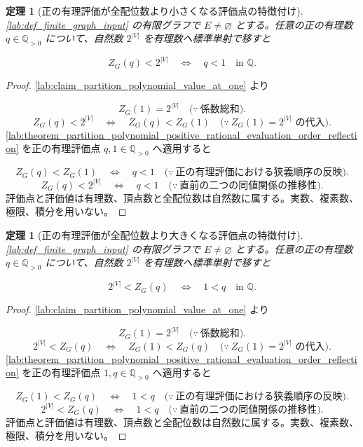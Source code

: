 \documentclass[11pt,a4paper]{article}
\newtheorem{theorem}[definition]{定理}
\theoremstyle{remark}
\begin{document}
\begin{theorem}[正の有理評価が全配位数より小さくなる評価点の特徴付け]\label{lab:theorem_partition_polynomial_positive_rational_evaluation_strictly_below_configuration_count}
\cref{lab:def_finite_graph_input}
 の有限グラフで 
$E\ne\varnothing$
 とする。任意の正の有理数 
$q\in\mathbb Q_{>0}$
 について、自然数 
$2^{|V|}$
 を有理数へ標準単射で移すと

\[Z_G(q)<2^{|V|}\quad\Longleftrightarrow\quad q<1\quad\text{in }\mathbb Q.\]
\end{theorem}
\begin{proof}
\cref{lab:claim_partition_polynomial_value_at_one}
 より

\[Z_G(1)=2^{|V|}
\quad\bigl(\because\ \text{係数総和}\bigr).\]
\[Z_G(q)<2^{|V|}
\quad\Longleftrightarrow\quad
Z_G(q)<Z_G(1)
\quad\bigl(\because\ Z_G(1)=2^{|V|}\text{ の代入}\bigr).\]
\cref{lab:theorem_partition_polynomial_positive_rational_evaluation_order_reflection}
 を正の有理評価点 
$q,1\in\mathbb Q_{>0}$
 へ適用すると

\[Z_G(q)<Z_G(1)
\quad\Longleftrightarrow\quad
q<1
\quad\bigl(\because\ \text{正の有理評価における狭義順序の反映}\bigr).\]
\[Z_G(q)<2^{|V|}
\quad\Longleftrightarrow\quad
q<1
\quad\bigl(\because\ \text{直前の二つの同値関係の推移性}\bigr).\]
評価点と評価値は有理数、頂点数と全配位数は自然数に属する。実数、複素数、極限、積分を用いない。

\end{proof}

\begin{theorem}[正の有理評価が全配位数より大きくなる評価点の特徴付け]\label{lab:theorem_partition_polynomial_positive_rational_evaluation_strictly_above_configuration_count}
\cref{lab:def_finite_graph_input}
 の有限グラフで 
$E\ne\varnothing$
 とする。任意の正の有理数 
$q\in\mathbb Q_{>0}$
 について、自然数 
$2^{|V|}$
 を有理数へ標準単射で移すと

\[2^{|V|}<Z_G(q)\quad\Longleftrightarrow\quad 1<q\quad\text{in }\mathbb Q.\]
\end{theorem}
\begin{proof}
\cref{lab:claim_partition_polynomial_value_at_one}
 より

\[Z_G(1)=2^{|V|}
\quad\bigl(\because\ \text{係数総和}\bigr).\]
\[2^{|V|}<Z_G(q)
\quad\Longleftrightarrow\quad
Z_G(1)<Z_G(q)
\quad\bigl(\because\ Z_G(1)=2^{|V|}\text{ の代入}\bigr).\]
\cref{lab:theorem_partition_polynomial_positive_rational_evaluation_order_reflection}
 を正の有理評価点 
$1,q\in\mathbb Q_{>0}$
 へ適用すると

\[Z_G(1)<Z_G(q)
\quad\Longleftrightarrow\quad
1<q
\quad\bigl(\because\ \text{正の有理評価における狭義順序の反映}\bigr).\]
\[2^{|V|}<Z_G(q)
\quad\Longleftrightarrow\quad
1<q
\quad\bigl(\because\ \text{直前の二つの同値関係の推移性}\bigr).\]
評価点と評価値は有理数、頂点数と全配位数は自然数に属する。実数、複素数、極限、積分を用いない。

\end{proof}
\end{document}
